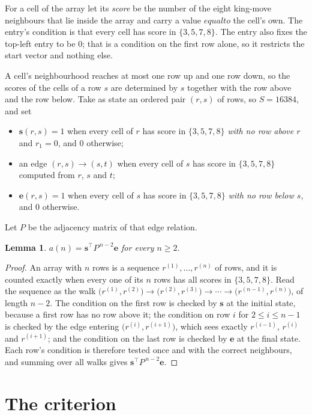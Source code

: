 \documentclass[11pt,a4paper]{article}
\theoremstyle{plain}
\newtheorem{lemma}[theorem]{Lemma}
\theoremstyle{definition}
\begin{document}
For a cell of the array let its \emph{score} be the number of the eight king-move neighbours that lie inside
the array and carry a value $equal to$ the cell's own. The entry's condition is that every cell
has score in $\{3,5,7,8\}$. The entry also fixes the top-left entry to be $0$; that is a condition on the first row alone, so it restricts the start vector and nothing else.

A cell's neighbourhood reaches at most one row up and one row down, so the scores of the
cells of a row $s$ are determined by $s$ together with the row above and the row below.
Take as state an ordered pair $(r,s)$ of rows, so $S=16384$, and set
\begin{itemize}
\item $\mathbf{s}(r,s)=1$ when every cell of $r$ has score in $\{3,5,7,8\}$ \emph{with no row
above $r$} and $r_1=0$, and $0$ otherwise;
\item an edge $(r,s)\to(s,t)$ when every cell of $s$ has score in $\{3,5,7,8\}$ computed from
$r$, $s$ and $t$;
\item $\mathbf{e}(r,s)=1$ when every cell of $s$ has score in $\{3,5,7,8\}$ \emph{with no row
below $s$}, and $0$ otherwise.
\end{itemize}
Let $P$ be the adjacency matrix of that edge relation.

\begin{lemma}\label{lem:walk}
$a(n)=\mathbf{s}^{\!\top}P^{\,n-2}\mathbf{e}$ for every $n\ge2$.
\end{lemma}

\begin{proof}
An array with $n$ rows is a sequence $r^{(1)},\dots,r^{(n)}$ of rows, and it is counted
exactly when every one of its $n$ rows has all scores in $\{3,5,7,8\}$. Read the sequence as the
walk $\bigl(r^{(1)},r^{(2)}\bigr)\to\bigl(r^{(2)},r^{(3)}\bigr)\to\cdots\to
\bigl(r^{(n-1)},r^{(n)}\bigr)$, of length $n-2$. The condition on the first row is
checked by $\mathbf{s}$ at the initial state, because a first row has no row above it; the
condition on row $i$ for $2\le i\le n-1$ is checked by the edge entering
$\bigl(r^{(i)},r^{(i+1)}\bigr)$, which sees exactly $r^{(i-1)}$, $r^{(i)}$ and
$r^{(i+1)}$; and the condition on the last row is checked by $\mathbf{e}$ at the final
state. Each row's condition is therefore tested once and with the correct neighbours, and
summing over all walks gives $\mathbf{s}^{\!\top}P^{\,n-2}\mathbf{e}$.
\end{proof}

\section{The criterion}
\end{document}
